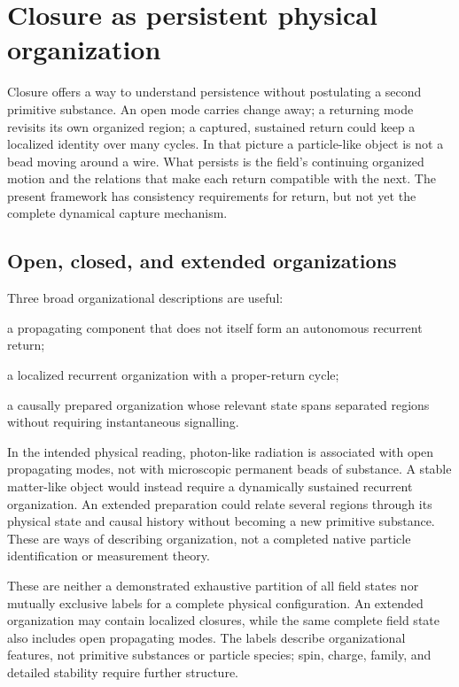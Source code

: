 \documentclass[11pt]{article}
\theoremstyle{definition}
\begin{document}
\section{Closure as persistent physical organization}
\label{sec:closure_gates}

Closure offers a way to understand persistence without postulating a second
primitive substance.  An open mode carries change away; a returning mode revisits
its own organized region; a captured, sustained return could keep a localized
identity over many cycles.  In that picture a particle-like object is not a
bead moving around a wire.  What persists is the field's continuing organized
motion and the relations that make each return compatible with the next.
The present framework has consistency requirements for return, but not yet
the complete dynamical capture mechanism.

\subsection{Open, closed, and extended organizations}
\label{subsec:taxonomy}

Three broad organizational descriptions are useful:
\begin{description}[style=nextline,leftmargin=2.3cm]
  \item[Open] a propagating component that does not itself form an autonomous recurrent return;
  \item[Closed] a localized recurrent organization with a proper-return cycle;
  \item[Extended] a causally prepared organization whose relevant state spans separated
  regions without requiring instantaneous signalling.
\end{description}
In the intended physical reading, photon-like radiation is associated with open
propagating modes, not with microscopic permanent beads of substance.  A stable
matter-like object would instead require a dynamically sustained recurrent
organization.  An extended preparation could relate several regions through
its physical state and causal history without becoming a new primitive
substance.  These are ways of describing organization, not a completed native
particle identification or measurement theory.

These are neither a demonstrated exhaustive partition of all field states nor mutually
exclusive labels for a complete physical configuration.  An extended organization may
contain localized closures, while the same complete field state also includes open
propagating modes.  The labels describe organizational features, not primitive substances
or particle species; spin, charge, family, and detailed stability require further structure.
\end{document}
